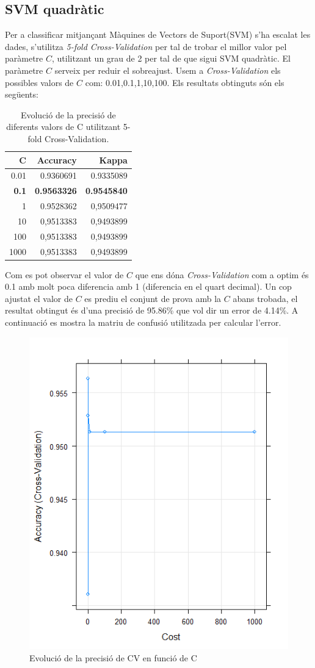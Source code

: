 \subsection{SVM quadràtic}
Per a classificar mitjançant Màquines de Vectors de Suport(SVM) s'ha escalat les dades, s'utilitza \textit{5-fold Cross-Validation} per tal de trobar el millor valor pel paràmetre $C$, utilitzant un grau de 2 per tal de que sigui SVM quadràtic. El paràmetre $C$ serveix per reduir el sobreajust. Usem a \textit{Cross-Validation} els possibles valors de $C$ com: 0.01,0.1,1,10,100. Els resultats obtinguts són els següents:
\begin{table}[H]
	\centering
	\def\arraystretch{1.2}
	\begin{tabular}{|rrr|}
		\hline
		C  & Accuracy & Kappa \\
		\hline
		0.01  &  0.9360691 & 0.9335089 \\
		\textbf{0.1}  &  \textbf{0.9563326} & \textbf{0.9545840} \\
		1  &  0.9528362 & 0,9509477 \\
		10  &  0,9513383 & 0,9493899 \\
		100  &  0,9513383 & 0,9493899 \\
		1000  &  0,9513383 & 0,9493899 \\
		\hline
	\end{tabular}
	\caption{Evolució de la precisió de diferents valors de C utilitzant 5-fold Cross-Validation.}
	\label{tab:nnet_k}
\end{table}
Com es pot observar el valor de $C$ que ens dóna \textit{Cross-Validation} com a optim és 0.1 amb molt poca diferencia amb 1 (diferencia en el quart decimal). Un cop ajustat el valor de $C$ es prediu el conjunt de prova amb la $C$ abans trobada, el resultat obtingut és d'una precisió de 95.86\% que vol dir un error de 4.14\%. A continuació es mostra la matriu de confusió utilitzada per calcular l'error.


\begin{figure}[H]
    \centering
    \includegraphics[height=0.8\textwidth]{img/plotsvmqmodel.png}
    \caption{Evolució de la precisió de CV en funció de C}
    \label{fig:svmqmodel}
\end{figure}   

